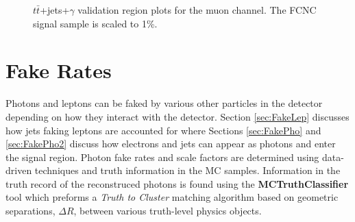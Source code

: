 \begin{figure}[h!]
\hfil  %
\caption{$t\bar{t}$+jets+$\gamma$ validation region plots for the muon channel.  The FCNC signal sample is scaled to 1\%.}
\label{fig:VR2muj}
\end{figure}

\section{Fake Rates}
\label{sec:Fakes}

Photons and leptons can be faked by various other particles in the detector depending on how they interact with the detector.  Section \ref{sec:FakeLep} discusses how jets faking leptons are accounted for where Sections \ref{sec:FakePho} and \ref{sec:FakePho2} discuss how electrons and jets can appear as photons and enter the signal region.  Photon fake rates and scale factors are determined using data-driven techniques and truth information in the MC samples.  Information in the truth record of the reconstruced photons is found using the \textbf{MCTruthClassifier} tool which preforms a \textit{Truth to Cluster} matching algorithm based on geometric separations, $\Delta R$, between various truth-level physics objects.

